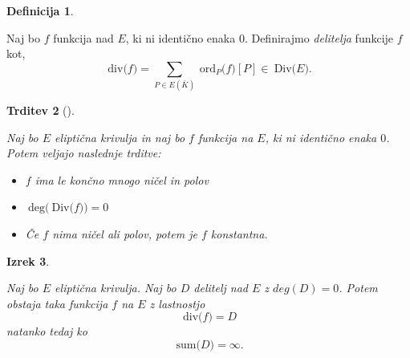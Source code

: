 \documentclass[12pt,a4paper,twoside]{article}
\theoremstyle{definition} %
\newtheorem{definicija}{Definicija}[section]
\theoremstyle{plain} %
\newtheorem{izrek}[definicija]{Izrek}
\newtheorem{trditev}[definicija]{Trditev}
\numberwithin{equation}{section}  %
\newcommand{\E}[1]{E({#1})}
\newcommand{\DIV}[1]{\ \text{Div(}{#1}\text{)}}
\newcommand{\DEG}[1]{\ \text{deg(}{#1}\text{)}}
\newcommand{\Div}[1]{\ \text{div(}{#1}\text{)}}
\newcommand{\SUM}[1]{\ \text{sum(}{#1}\text{)}}
\newcommand{\ORDp}[2]{\ \text{ord}_{#2}({#1}\text{)}}
\begin{document}
\begin{definicija}~

Naj bo $f$ funkcija nad $E$, ki ni identično enaka $0$. Definirajmo \emph{delitelja} funkcije $f$ kot,
$$\Div{f} = \sum_{P\in \E{\overline{K}}} \ORDp{f}{P}[P] \in \DIV{E}.$$
\end{definicija}


\begin{trditev}[]~

\label{trditev 11.1}
Naj bo $E$ eliptična krivulja in naj bo $f$ funkcija na $E$, ki ni identično enaka $0$. Potem veljajo naslednje trditve:
\begin{itemize}

\item $f$ ima le končno mnogo ničel in polov
\item $\DEG{\DIV{f}}=0$
\item Če $f$ nima ničel ali polov, potem je $f$ konstantna.
\end{itemize}


\end{trditev}

\begin{izrek}~

\label{izrek 11.2}
Naj bo $E$ eliptična krivulja. Naj bo $D$ delitelj nad $E$ z $deg(D) = 0$. Potem obstaja taka funkcija $f$ na $E$ z lastnostjo
$$\Div{f} = D$$
natanko tedaj ko
$$\SUM{D} = \infty.$$

\end{izrek}
\end{document}
